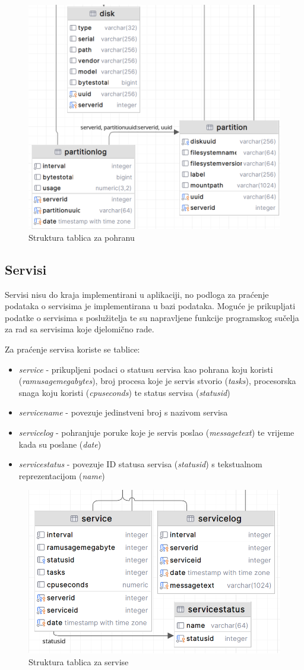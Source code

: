\documentclass[zavrsnirad]{fer}
\begin{document}
\begin{figure}[htb!]
	\centering
	\includegraphics[width=0.6\linewidth]{images/db_storage.png} 
	\caption{Struktura tablica za pohranu}
\end{figure}
\FloatBarrier

\subsection{Servisi}
Servisi nisu do kraja implementirani u aplikaciji, no podloga za praćenje podataka o servisima je implementirana u bazi podataka. Moguće je prikupljati podatke o servisima s poslužitelja te su napravljene funkcije programskog sučelja za rad sa servisima koje djelomično rade.

Za praćenje servisa koriste se tablice:
\begin{itemize}
	\item \textit{service} - prikupljeni podaci o statusu servisa kao pohrana koju koristi (\textit{ramusagemegabytes}), broj procesa koje je servis stvorio (\textit{tasks}), procesorska snaga koju koristi (\textit{cpuseconds}) te status servisa (\textit{statusid})
	\item \textit{servicename} - povezuje jedinstveni broj s nazivom servisa
	\item \textit{servicelog} - pohranjuje poruke koje je servis poslao (\textit{messagetext}) te vrijeme kada su poslane (\textit{date})
	\item \textit{servicestatus} - povezuje ID statusa servisa (\textit{statusid}) s tekstualnom reprezentacijom (\textit{name})
\end{itemize}

\begin{figure}[htb!]
	\centering
	\includegraphics[width=0.6\linewidth]{images/db_services.png} 
	\caption{Struktura tablica za servise}
\end{figure}
\FloatBarrier
\end{document}
